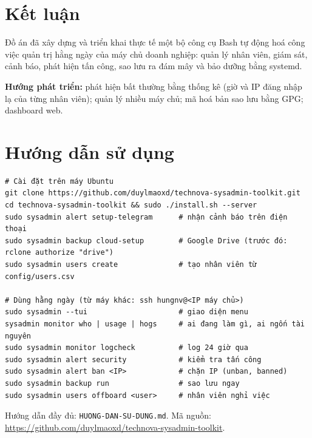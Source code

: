 \documentclass[12pt,a4paper,oneside]{report}
\newcommand{\RepoURL}{https://github.com/duylmaoxd/technova-sysadmin-toolkit}
\newcommand{\cmd}[1]{\texttt{\small #1}}
\newcommand{\chapname}{CHƯƠNG}
\begin{document}
\chapter{Kết luận}
Đồ án đã xây dựng và triển khai thực tế một bộ công cụ Bash tự động hoá công việc quản trị hằng ngày của máy chủ doanh nghiệp: quản lý nhân viên, giám sát, cảnh báo, phát hiện tấn công, sao lưu ra đám mây và bảo dưỡng bằng systemd.

\textbf{Hướng phát triển:} phát hiện bất thường bằng thống kê (giờ và IP đăng nhập lạ của từng nhân viên); quản lý nhiều máy chủ; mã hoá bản sao lưu bằng GPG; dashboard web.

\appendix
\renewcommand{\chapname}{PHỤ LỤC}
\chapter{Hướng dẫn sử dụng}
\begin{Verbatim}
# Cài đặt trên máy Ubuntu
git clone https://github.com/duylmaoxd/technova-sysadmin-toolkit.git
cd technova-sysadmin-toolkit && sudo ./install.sh --server
sudo sysadmin alert setup-telegram      # nhận cảnh báo trên điện thoại
sudo sysadmin backup cloud-setup        # Google Drive (trước đó: rclone authorize "drive")
sudo sysadmin users create              # tạo nhân viên từ config/users.csv

# Dùng hằng ngày (từ máy khác: ssh hungnv@<IP máy chủ>)
sudo sysadmin --tui                     # giao diện menu
sysadmin monitor who | usage | hogs     # ai đang làm gì, ai ngốn tài nguyên
sudo sysadmin monitor logcheck          # log 24 giờ qua
sudo sysadmin alert security            # kiểm tra tấn công
sudo sysadmin alert ban <IP>            # chặn IP (unban, banned)
sudo sysadmin backup run                # sao lưu ngay
sudo sysadmin users offboard <user>     # nhân viên nghỉ việc
\end{Verbatim}
Hướng dẫn đầy đủ: \cmd{HUONG-DAN-SU-DUNG.md}. Mã nguồn: \url{\RepoURL}.
\end{document}
